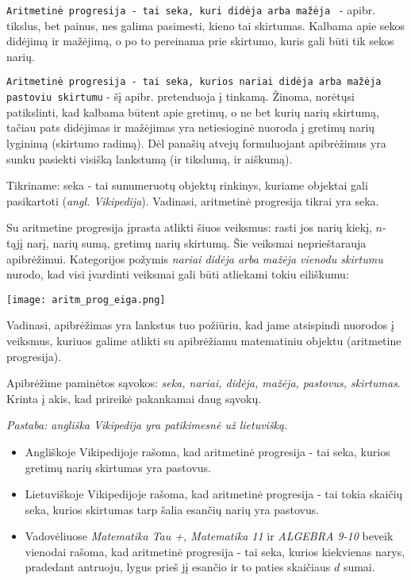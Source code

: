 \documentclass{article}
\begin{document}
\texttt{Aritmetinė progresija - tai seka, kuri didėja arba mažėja {\color{red}{pastoviu skirtumu}}} - apibr. tikslus, bet painus, nes galima pasimesti, kieno tai skirtumas. Kalbama apie sekos didėjimą ir mažėjimą, o po to pereinama prie skirtumo, kuris gali būti tik sekos narių.

\texttt{Aritmetinė progresija - tai seka, kurios nariai didėja arba mažėja pastoviu skirtumu} - šį apibr. pretenduoja į tinkamą. Žinoma, norėtųsi patikslinti, kad kalbama būtent apie gretimų, o ne bet kurių narių skirtumą, tačiau pats didėjimas ir mažėjimas yra netiesioginė nuoroda į gretimų narių lyginimą (skirtumo radimą). Dėl panašių atvejų formuluojant apibrėžimus yra sunku pasiekti visišką lankstumą (ir tikslumą, ir aiškumą).


Tikriname: seka - tai sunumeruotų objektų rinkinys, kuriame objektai gali pasikartoti (\textit{angl. Vikipedija}). Vadinasi, aritmetinė progresija tikrai yra seka. 


Su aritmetine progresija įprasta atlikti šiuos veiksmus: rasti jos narių kiekį, $n$- tąjį narį, narių sumą, gretimų narių skirtumą. Šie veiksmai neprieštarauja apibrėžimui. Kategorijos požymis \textit{nariai didėja arba mažėja vienodu skirtumu} nurodo, kad visi įvardinti veiksmai gali būti atliekami tokiu eiliškumu:

\texttt{[image: aritm\_prog\_eiga.png]}

Vadinasi, apibrėžimas yra lankstus tuo požiūriu, kad jame atsispindi nuorodos į veiksmus, kuriuos galime atlikti su apibrėžiamu matematiniu objektu (aritmetine progresija).


Apibrėžime paminėtos sąvokos: \textit{seka, nariai, didėja, mažėja, pastovus, skirtumas}. Krinta į akis, kad prireikė pakankamai daug sąvokų.


\textit{Pastaba: angliška Vikipedija yra patikimesnė už lietuvišką.}
\begin{itemize}
\item Angliškoje Vikipedijoje rašoma, kad aritmetinė progresija - tai seka, kurios gretimų narių skirtumas yra pastovus. 

\item Lietuviškoje Vikipedijoje rašoma, kad aritmetinė progresija - tai tokia skaičių seka, kurios skirtumas tarp šalia esančių narių yra pastovus. 

\item Vadovėliuose \textit{Matematika Tau +, Matematika 11} ir \textit{ALGEBRA 9-10} beveik vienodai rašoma, kad aritmetinė progresija - tai seka, kurios kiekvienas narys, pradedant antruoju, lygus prieš jį esančio ir to paties skaičiaus $d$ sumai.
\end{itemize}
\end{document}
